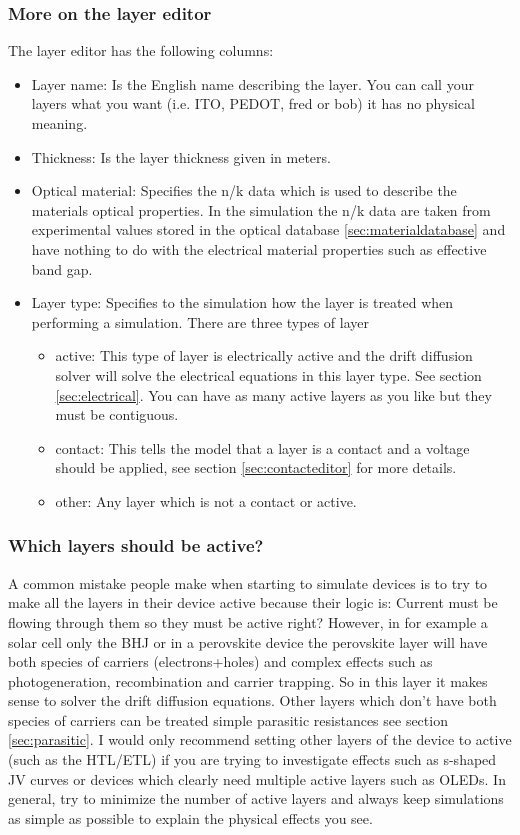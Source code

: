 \subsubsection{More on the layer editor}
The layer editor has the following columns:

\begin{itemize}
  \item Layer name: Is the English name describing the layer. You can call your layers what you want (i.e. ITO, PEDOT, fred or bob) it has no physical meaning.
  \item Thickness: Is the layer thickness given in meters.
  \item Optical material: Specifies the n/k data which is used to describe the materials optical properties. In the simulation the n/k data are taken from experimental values stored in the optical database \ref{sec:materialdatabase} and have nothing to do with the electrical material properties such as effective band gap.
  \item Layer type: Specifies to the simulation how the layer is treated when performing a simulation. There are three types of layer
	\begin{itemize}
	  \item active: This type of layer is electrically active and the drift diffusion solver will solve the electrical equations in this layer type. See section \ref{sec:electrical}. You can have as many active layers as you like but they must be contiguous.
 	  \item contact: This tells the model that a layer is a contact and a voltage should be applied, see section \ref{sec:contacteditor} for more details.
 	  \item other: Any layer which is not a contact or active.

	\end{itemize}
\end{itemize}



\subsubsection{Which layers should be active?}
A common mistake people make when starting to simulate devices is to try to make all the layers in their device active because their logic is: Current must be flowing through them so they must be active right?  However, in for example a solar cell only the BHJ or in a perovskite device the perovskite layer will have both species of carriers (electrons+holes) and complex effects such as photogeneration, recombination and carrier trapping. So in this layer it makes sense to solver the drift diffusion equations.  Other layers which don't have both species of carriers can be treated simple parasitic resistances see section \ref{sec:parasitic}. I would only recommend setting other layers of the device to active (such as the HTL/ETL) if you are trying to investigate effects such as s-shaped JV curves or devices which clearly need multiple active layers such as OLEDs. In general, try to minimize the number of active layers and always keep simulations as simple as possible to explain the physical effects you see.  

